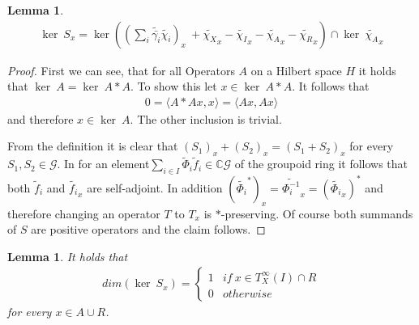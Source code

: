 \documentclass[12pt,a4paper]{scrartcl}
\newtheorem{Lemma}[Theorem]{Lemma}
\numberwithin{equation}{section}
\newcommand{\C}{\mathbb{C}} %
\newcommand{\2}{\mathbb{Z} / 2 \mathbb{Z}}
\newcommand{\G}{\mathcal{G}}
\newcommand{\1}{\bar{1}}
\newcommand{\0}{\bar{0}}
\begin{document}
\begin{Lemma}
	\begin{align*}
	\ker \ S_x = \ker((\sum_{i} \tilde{\bar{\gamma_i}} \tilde{\chi_i})_x \ + \tilde{\chi_X}_x - \tilde{\chi_I}_x - \tilde{\chi_A}_x - \tilde{\chi_R}_x) \cap \ker \ \tilde{\chi_A}_x
	\end{align*}
\end{Lemma}
\begin{proof}
	First we can see, that for all Operators $A$ on a Hilbert space $H$ it holds that $\ker \ A = \ker \ A*A$. To show this let $x \in \ker \ A*A$. It follows that
	\begin{align*}
		0 = \langle A*Ax, x \rangle = \langle Ax, Ax \rangle
	\end{align*}
	and therefore $x \in \ker \ A$. The other inclusion is trivial. 
	
	From the definition it is clear that $(S_1)_x + (S_2)_x = (S_1 + S_2)_x$ for every $S_1, S_2 \in \G$. In for an element$\sum_{i \in I} \tilde \Phi_i\tilde f_i \in \C\G$ of the  groupoid ring it follows that both $\tilde f_i$ and $\tilde {f_i}_x$ are self-adjoint. In addition $(\widetilde {\Phi_i}^*)_x = \widetilde {\Phi_i^{-1}}_x = (\widetilde {\Phi_i}_x)^*$  and therefore changing an operator $T$ to $T_x$ is $*$-preserving. Of course both summands of $S$ are positive operators and the claim follows.
\end{proof}
\begin{Lemma}
	It holds that
	\begin{align*}
		dim (\ker \ S_x) = \begin{cases}
		1 & if \ x \in T_X^\infty(I) \cap R\\
		0 & otherwise 
		\end{cases}
	\end{align*}
	for every $x \in A \cup R$.
\end{Lemma}
\end{document}
